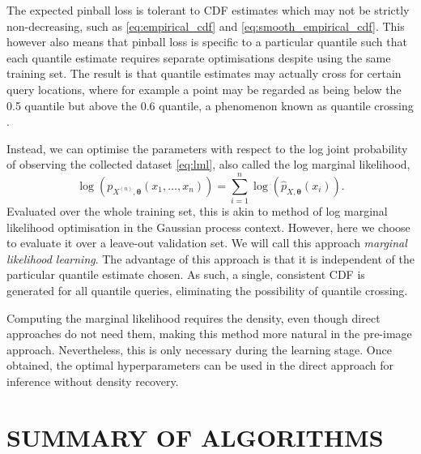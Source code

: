 \documentclass[twoside]{article} \usepackage{aistats2017}
\theoremstyle{definition}
\theoremstyle{theorem}
\newcommand{\rv}[1]{{#1}}
\begin{document}
	The expected pinball loss is tolerant to CDF estimates which may not be strictly non-decreasing, such as \eqref{eq:empirical_cdf} and \eqref{eq:smooth_empirical_cdf}. This however also means that pinball loss is specific to a particular quantile such that each quantile estimate requires separate optimisations despite using the same training set. The result is that quantile estimates may actually cross for certain query locations, where for example a point may be regarded as being below the 0.5 quantile but above the 0.6 quantile, a phenomenon known as quantile crossing \citep{he1997quantile}. 
	
	Instead, we can optimise the parameters with respect to the log joint probability of observing the collected dataset \eqref{eq:lml}, also called the log marginal likelihood,
	\begin{equation}
		\log(p_{\rv{X}^{(n)}, \bm{\theta}}(x_{1}, \dots, x_{n}))= \sum_{i = 1}^{n} \log(\hat{p}_{\rv{X}, \bm{\theta}}(x_{i})).
	\label{eq:lml}
	\end{equation}
	Evaluated over the whole training set, this is akin to method of log marginal likelihood optimisation in the Gaussian process context. However, here we choose to evaluate it over a leave-out validation set. We will call this approach \textit{marginal likelihood learning}. The advantage of this approach is that it is independent of the particular quantile estimate chosen. As such, a single, consistent CDF is generated for all quantile queries, eliminating the possibility of quantile crossing. 

	Computing the marginal likelihood requires the density, even though direct approaches do not need them, making this method more natural in the pre-image approach. Nevertheless, this is only necessary during the learning stage. Once obtained, the optimal hyperparameters can be used in the direct approach for inference without density recovery.

\section{SUMMARY OF ALGORITHMS}
\label{sec:quantile_regression_algorithms}
\end{document}
